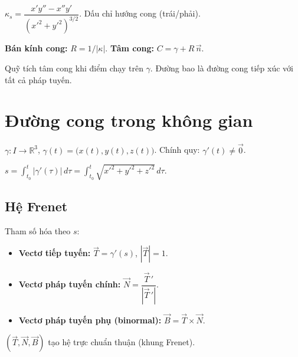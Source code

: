\documentclass[12pt,a4paper]{article}
\begin{document}
\begin{dinhnghia}[title={Độ cong có dấu}]
  $\kappa_s = \dfrac{x'y'' - x''y'}{(x'^2 + y'^2)^{3/2}}$. Dấu chỉ hướng cong (trái/phải).

  \textbf{Bán kính cong:} $R = 1/|\kappa|$. \textbf{Tâm cong:} $C = \gamma + R\,\vec{n}$.
\end{dinhnghia}

\begin{dinhnghia}[title={Đường bao (evolute)}]
  Quỹ tích tâm cong khi điểm chạy trên $\gamma$. Đường bao là đường cong tiếp xúc với tất cả pháp tuyến.
\end{dinhnghia}

\section{Đường cong trong không gian}

\begin{dinhnghia}[title={Đường cong không gian}]
  $\gamma: I \to \mathbb{R}^3$, $\gamma(t) = \bigl(x(t), y(t), z(t)\bigr)$. Chính quy: $\gamma'(t) \ne \vec{0}$.
\end{dinhnghia}

\begin{dinhnghia}[title={Độ dài cung}]
  $s = \displaystyle\int_{t_0}^{t} |\gamma'(\tau)|\,d\tau = \int_{t_0}^{t}\sqrt{x'^2 + y'^2 + z'^2}\,d\tau$.
\end{dinhnghia}

\subsection{Hệ Frenet}

\begin{dinhnghia}[title={Ba vectơ Frenet}]
  Tham số hóa theo $s$:
  \begin{itemize}
    \item \textbf{Vectơ tiếp tuyến:} $\vec{T} = \gamma'(s)$, \;$|\vec{T}| = 1$.
    \item \textbf{Vectơ pháp tuyến chính:} $\vec{N} = \dfrac{\vec{T}\,'}{|\vec{T}\,'|}$.
    \item \textbf{Vectơ pháp tuyến phụ (binormal):} $\vec{B} = \vec{T} \times \vec{N}$.
  \end{itemize}
  $(\vec{T}, \vec{N}, \vec{B})$ tạo hệ trực chuẩn thuận (khung Frenet).
\end{dinhnghia}
\end{document}
